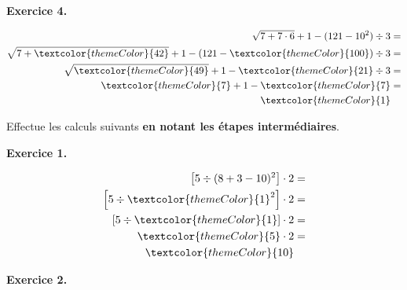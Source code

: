 \vspace{30pt}
{\bfseries\color{themeColor}Exercice 4.} 

{\vspace{-30pt}\color{black}
\begin{align*}
\sqrt{7 + 7\cdot 6} + 1 - (121 - 10^2) \div 3 &= \\
\sqrt{7 + \textcolor{themeColor}{42}} + 1 - (121 - \textcolor{themeColor}{100}) \div 3 &= \\
\sqrt{\textcolor{themeColor}{49}} + 1 - \textcolor{themeColor}{21} \div 3 &= \\
\textcolor{themeColor}{7} + 1 - \textcolor{themeColor}{7} &= \\
\textcolor{themeColor}{1}
\end{align*}
}


\newpage
{}

Effectue les calculs suivants \textbf{en notant les étapes intermédiaires}.

\vspace{30pt}
{\bfseries\color{themeColor}Exercice 1.} 

{\vspace{-30pt}\color{black}
\begin{align*}
\left[5 \div (8 + 3 -10)^2\right] \cdot 2 &= \\
\left[5 \div \textcolor{themeColor}{1}^2\right] \cdot 2 &= \\
\left[5 \div \textcolor{themeColor}{1}\right] \cdot 2 &= \\
\textcolor{themeColor}{5}\cdot 2 &= \\
\textcolor{themeColor}{10}
\end{align*}
}

\vspace{30pt}
{\bfseries\color{themeColor}Exercice 2.} 

